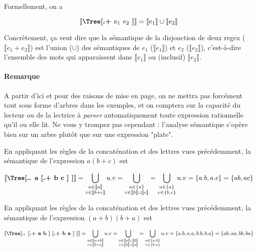 Formellement, on a 

\[\mt{\Tree[.{+} $e_1$ $e_2$ ]} = \llbracket e_1 \rrbracket \cup \llbracket e_2 \rrbracket \]

Concrètement, ça veut dire que la sémantique de la disjonction de deux regex ($\llbracket e_1 + e_2 \rrbracket$) est l'union ($\cup$) des sémantiques de $e_1$ ($\llbracket e_1 \rrbracket$) et $e_2$ ($\llbracket e_2 \rrbracket$), c'est-à-dire l'ensemble des mots qui apparaissent dans $\llbracket e_1 \rrbracket$ ou (inclusif) $\llbracket e_2 \rrbracket$.

\paragraph*{Remarque} A partir d'ici et pour des raisons de mise en page, on ne mettra pas forcément tout sous forme d'arbres dans les exemples, et on comptera sur la capacité du lecteur ou de la lectrice à \textit{parser} automatiquement toute expression rationnelle qu'il ou elle lit. Ne vous y trompez pas cependant : l'analyse sémantique s'opère bien sur un arbre plutôt que sur une expression "plate". 

\begin{example}
En appliquant les règles de la concaténation et des lettres vues précédemment, la sémantique de l'expression $a(b+c)$ est 

\[\mt{\Tree[.{.} a [.{+} b c ] ]} = \bigcup_{\substack{u \in \llbracket a \rrbracket \\ v \in \llbracket b + c \rrbracket }} u.v = \bigcup_{\substack{u \in \{a\} \\ v \in \llbracket b \rrbracket \cup \llbracket c \rrbracket}} = \bigcup_{\substack{u \in \{a\} \\ v \in \{b,c\} }} u.v = \{a.b, a.c\} = \{ab, ac\}\]
\end{example}

\begin{example}
En appliquant les règles de la concaténation et des lettres vues précédemment, la sémantique de l'expression $(a+b)(b+a)$ est 

\[\mt{\Tree[.{.} [.{+} a b ] [.{+} b a ] ]} = \bigcup_{\substack{u \in \llbracket a + b \rrbracket \\ v \in \llbracket b + a \rrbracket }} u.v = \bigcup_{\substack{u \in \llbracket a \rrbracket \cup \llbracket b \rrbracket \\ v \in \llbracket b \rrbracket \cup \llbracket a \rrbracket}} = \bigcup_{\substack{u \in \{a,b\} \\ v \in \{b,a\} }} u.v = \{a.b, a.a, b.b, b.a\} = \{ab, aa, bb, ba\}\]
\end{example}

